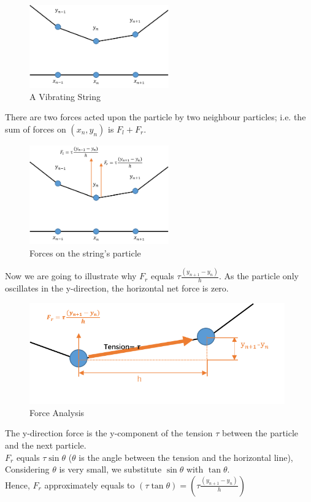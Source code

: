 \documentclass[UTF8,10pt,a4paper]{ctexart}
\begin{document}
		\begin{figure}[ht]
			\centering
			\includegraphics[width=6cm]{vibratingString.png}
			\caption{A Vibrating String}
			\label{fig:vibStr}
		\end{figure}		
  		
		There are two forces acted upon the particle by two neighbour particles;
		i.e. the sum of forces on $(x_n,y_n)$ is $F_l+F_r$.\\
		\begin{figure}[ht]
			\centering
			\includegraphics[width=6cm]{vibratingStringF.png}
			\caption{Forces on the string's particle}
			\label{fig:vibStrF}
		\end{figure}
		
		
		\noindent		  
		Now we are going to illustrate why $F_r$ equals  $\tau\frac{(y_{n+1}-y_n)}{h}$. 
		As the particle only oscillates in the y-direction, the horizontal net force is zero.\\		 
		\begin{figure}[h]
			\centering
			\includegraphics[width=11cm]{tension.png}
			\caption{Force Analysis}
			\label{fig:tens}
		\end{figure}	
		
		
		\noindent
		The y-direction force is the y-component of the tension $\tau$ between the particle and 
		the next particle.\\
		$F_r$ equals $\tau \sin\theta$ ($\theta$ is the angle between the tension and the horizontal line),
		Considering $\theta$ is very small, we substitute $\sin\theta$ with $\tan\theta$.\\
		Hence, $F_r$ approximately equals to $(\tau \tan\theta)= (\tau\frac{(y_{n+1}-y_n)}{h})$ 
		
\end{document}
